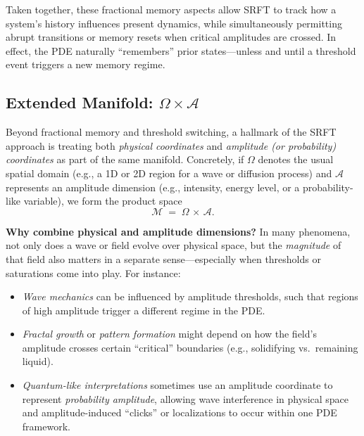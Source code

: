 \documentclass[12pt]{article}
\begin{document}
\medskip

\noindent
Taken together, these fractional memory aspects allow SRFT to track how a system’s
history influences present dynamics, while simultaneously permitting abrupt
transitions or memory resets when critical amplitudes are crossed. In effect,
the PDE naturally “remembers” prior states—unless and until a threshold event
triggers a new memory regime.


\subsection{Extended Manifold: \texorpdfstring{\(\Omega \times \mathcal{A}\)}{}}
\label{subsec:extended_manifold}

Beyond fractional memory and threshold switching, a hallmark of the SRFT approach is
treating both \emph{physical coordinates} and \emph{amplitude (or probability) coordinates}
as part of the same manifold. Concretely, if $\Omega$ denotes the usual spatial domain
(e.g., a 1D or 2D region for a wave or diffusion process) and $\mathcal{A}$ represents
an amplitude dimension (e.g., intensity, energy level, or a probability-like variable),
we form the product space
\[
  \mathcal{M} \;=\; \Omega \,\times\, \mathcal{A}.
\]

\medskip

\noindent
\textbf{Why combine physical and amplitude dimensions?}
In many phenomena, not only does a wave or field evolve over physical space,
but the \emph{magnitude} of that field also matters in a separate sense—especially
when thresholds or saturations come into play. For instance:
\begin{itemize}
    \item \emph{Wave mechanics} can be influenced by amplitude thresholds, 
          such that regions of high amplitude trigger a different regime 
          in the PDE. 
    \item \emph{Fractal growth} or \emph{pattern formation} might depend 
          on how the field’s amplitude crosses certain “critical” boundaries 
          (e.g., solidifying vs.\ remaining liquid). 
    \item \emph{Quantum-like interpretations} sometimes use an amplitude 
          coordinate to represent \textit{probability amplitude}, allowing 
          wave interference in physical space and amplitude-induced “clicks” 
          or localizations to occur within one PDE framework.
\end{itemize}
\end{document}
